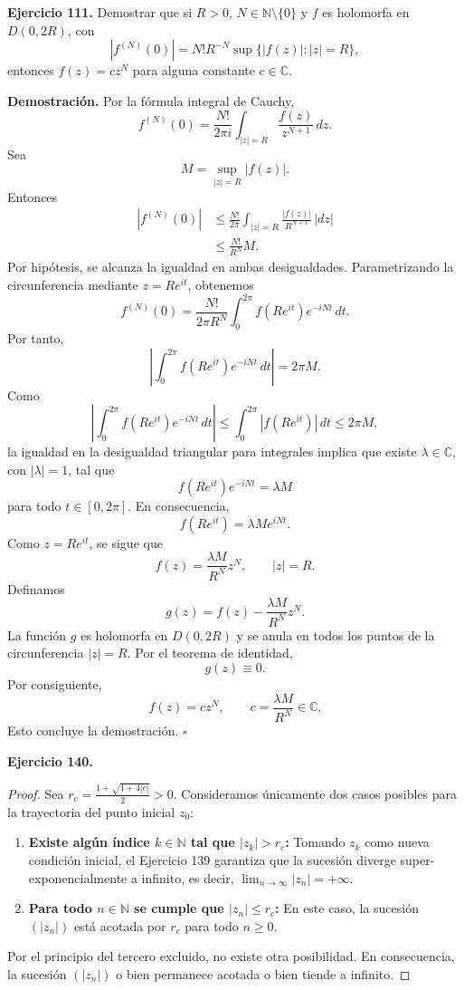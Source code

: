 \documentclass[11pt,a4paper]{article}
\theoremstyle{definition}
\theoremstyle{plain}
\theoremstyle{remark}
\begin{document}
	\textbf{Ejercicio 111.} Demostrar que si \(R>0\), \(N\in\mathbb{N}\setminus\{0\}\) y \(f\) es holomorfa en \(D(0,2R)\), con
	\[
	|f^{(N)}(0)|=N!R^{-N}\sup\{|f(z)|:|z|=R\},
	\]
	entonces \(f(z)=cz^N\) para alguna constante \(c\in\mathbb{C}\).
	
	\textbf{Demostración.} Por la fórmula integral de Cauchy,
	\[
	f^{(N)}(0)=\frac{N!}{2\pi i}
	\int_{|z|=R}\frac{f(z)}{z^{N+1}}\,dz.
	\]
	Sea
	\[
	M=\sup_{|z|=R}|f(z)|.
	\]
	Entonces
	\[
	\begin{aligned}
		|f^{(N)}(0)|
		&\leq \frac{N!}{2\pi}
		\int_{|z|=R}\frac{|f(z)|}{R^{N+1}}\,|dz|\\
		&\leq \frac{N!}{R^N}M.
	\end{aligned}
	\]
	Por hipótesis, se alcanza la igualdad en ambas desigualdades. Parametrizando la circunferencia mediante \(z=Re^{it}\), obtenemos
	\[
	f^{(N)}(0)=\frac{N!}{2\pi R^N}
	\int_0^{2\pi}f(Re^{it})e^{-iNt}\,dt.
	\]
	Por tanto,
	\[
	\left|\int_0^{2\pi}f(Re^{it})e^{-iNt}\,dt\right|
	=2\pi M.
	\]
	Como
	\[
	\left|\int_0^{2\pi}f(Re^{it})e^{-iNt}\,dt\right|
	\leq \int_0^{2\pi}|f(Re^{it})|\,dt
	\leq 2\pi M,
	\]
	la igualdad en la desigualdad triangular para integrales implica que existe \(\lambda\in\mathbb{C}\), con \(|\lambda|=1\), tal que
	\[
	f(Re^{it})e^{-iNt}=\lambda M
	\]
	para todo \(t\in[0,2\pi]\). En consecuencia,
	\[
	f(Re^{it})=\lambda M e^{iNt}.
	\]
	Como \(z=Re^{it}\), se sigue que
	\[
	f(z)=\frac{\lambda M}{R^N}z^N,
	\qquad |z|=R.
	\]
	Definamos
	\[
	g(z)=f(z)-\frac{\lambda M}{R^N}z^N.
	\]
	La función \(g\) es holomorfa en \(D(0,2R)\) y se anula en todos los puntos de la circunferencia \(|z|=R\). Por el teorema de identidad,
	\[
	g(z)\equiv 0.
	\]
	Por consiguiente,
	\[
	f(z)=cz^N,
	\qquad c=\frac{\lambda M}{R^N}\in\mathbb{C}.
	\]
	Esto concluye la demostración. \(\square\) 
	
	\noindent\textbf{Ejercicio 140.}
	\begin{proof}
		Sea $r_c = \frac{1 + \sqrt{1 + 4|c|}}{2} > 0$. Consideramos únicamente dos casos posibles para la trayectoria del punto inicial $z_0$:
		
		\begin{enumerate}
			\item \textbf{Existe algún índice $k \in \mathbb{N}$ tal que $|z_k| > r_c$:} 
			Tomando $z_k$ como nueva condición inicial, el Ejercicio 139 garantiza que la sucesión diverge super-exponencialmente a infinito, es decir, $\lim_{n \to \infty} |z_n| = +\infty$.
			
			\item \textbf{Para todo $n \in \mathbb{N}$ se cumple que $|z_n| \le r_c$:} 
			En este caso, la sucesión $(|z_n|)$ está acotada por $r_c$ para todo $n \ge 0$.
		\end{enumerate}
		
		Por el principio del tercero excluido, no existe otra posibilidad. En consecuencia, la sucesión $(|z_n|)$ o bien permanece acotada o bien tiende a infinito.
	\end{proof}
	
\end{document}
